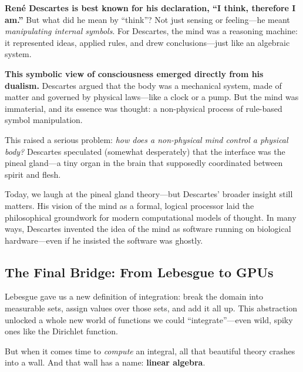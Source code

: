 \begin{tcolorbox}[colback=blue!5!white, colframe=blue!50!black, title=Historical Sidebar: Descartes and the Symbolic Soul]

  \textbf{René Descartes is best known for his declaration, “I think, therefore I am.”} But what did he mean by “think”? Not just sensing or feeling—he meant \emph{manipulating internal symbols}. For Descartes, the mind was a reasoning machine: it represented ideas, applied rules, and drew conclusions—just like an algebraic system.

  \medskip

  \textbf{This symbolic view of consciousness emerged directly from his dualism.} Descartes argued that the body was a mechanical system, made of matter and governed by physical laws—like a clock or a pump. But the mind was immaterial, and its essence was thought: a non-physical process of rule-based symbol manipulation.

  \medskip

  This raised a serious problem: \emph{how does a non-physical mind control a physical body?} Descartes speculated (somewhat desperately) that the interface was the pineal gland—a tiny organ in the brain that supposedly coordinated between spirit and flesh.

  \medskip

  Today, we laugh at the pineal gland theory—but Descartes’ broader insight still matters. His vision of the mind as a formal, logical processor laid the philosophical groundwork for modern computational models of thought. In many ways, Descartes invented the idea of the mind as software running on biological hardware—even if he insisted the software was ghostly.

\end{tcolorbox}



\subsection{The Final Bridge: From Lebesgue to GPUs}

Lebesgue gave us a new definition of integration: break the domain into measurable sets, assign values over those sets, and add it all up. This abstraction unlocked a whole new world of functions we could “integrate”—even wild, spiky ones like the Dirichlet function.

But when it comes time to \emph{compute} an integral, all that beautiful theory crashes into a wall. And that wall has a name: \textbf{linear algebra}.


